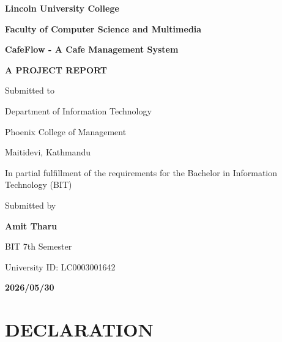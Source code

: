 \documentclass[12pt,a4paper]{report}
\newcommand{\fyptitle}{CafeFlow - A Cafe Management System}
\begin{document}
\begin{titlepage}
  \centering
  {\LARGE\bfseries Lincoln University College\par}
  \vspace{6mm}
  {\Large\bfseries Faculty of Computer Science and Multimedia\par}
  \vspace{12mm}
  {\LARGE\bfseries \fyptitle\par}
  \vspace{8mm}
  {\Large\bfseries A PROJECT REPORT\par}
  \vspace{8mm}
  {\large Submitted to\par}
  \vspace{4mm}
  {\large Department of Information Technology\par}
  \vspace{2mm}
  {\large Phoenix College of Management\par}
  \vspace{2mm}
  {\large Maitidevi, Kathmandu\par}
  \vspace{8mm}
  {\large In partial fulfillment of the requirements for the Bachelor in Information Technology (BIT)\par}
  \vspace{10mm}
  {\large Submitted by\par}
  \vspace{3mm}
  {\large\bfseries Amit Tharu\par}
  \vspace{2mm}
  {\large BIT 7th Semester\par}
  \vspace{2mm}
  {\large University ID: LC0003001642\par}
  \vspace{8mm}
  {\large\bfseries 2026/05/30\par}
  \vfill
\end{titlepage}

\setcounter{page}{1}

\chapter*{DECLARATION}
\thispagestyle{plain}
\end{document}
